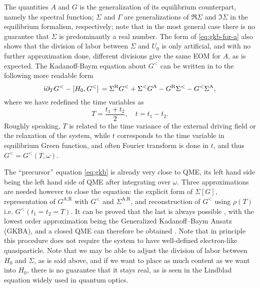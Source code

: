 \documentclass[hyperref, a4paper]{article}
\newcommand*{\ii}{\mathrm{i}}
\begin{document}
The quantities $A$ and $G$  
is the generalization of its equilibrium counterpart, 
namely the spectral function;
$\Sigma$ and $\Gamma$ are generalizations of 
$\Re \Sigma$ and $\Im \Sigma$ in the equilibrium formalism, respectively;
note that in the most general case 
there is no guarantee that $\Sigma$ is predominantly a real number.
The form of \eqref{eq:gkb-for-a} also shows 
that the division of labor between $\Sigma$ and $U_0$
is only artificial, 
and with no further approximation done, 
different divisions give the same EOM for $A$,
as is expected.
The Kadanoff-Baym equation about $G^<$ can be written in to the following more readable form
\begin{equation}
    \ii \partial_T G^< - \comm*{H_0}{G^<} = 
    \Sigma^{\text{R}} G^< + \Sigma^< G^{\text{A}} - G^{\text{R}} \Sigma^< - G^< \Sigma^{\text{A}},
    \label{eq:gkb}
\end{equation}
where we have redefined the time variables as 
\begin{equation}
    T = \frac{t_1 + t_2}{2}, \quad t = t_1 - t_2.
\end{equation}
Roughly speaking, $T$ is related to the time variance 
of the external driving field or the relaxation of the system,
while $t$ corresponds to the time variable 
in equilibrium Green function,
and often Fourier transform is done in $t$,
and thus $G^< = G^<(T, \omega)$. 


The ``precursor'' equation \eqref{eq:gkb} is already very close to QME,
its left hand side being the left hand side of QME 
after integrating over $\omega$.
Three approximations are needed however to close the equation:
the explicit form of $\Sigma[G]$,
representation of $G^{\text{A}, \text{R}}$ with $G^<$ and $\Sigma^{\text{A}, \text{R}}$,
and reconstruction of $G^<$ using $\rho(T)$ i.e. $G^<(t_1 = t_2 = T)$.
It can be proved that the last is always possible \cite{vspivcka2005long},
with the lowest order approximation being the 
Generalized Kadanoff–Baym Ansatz (GKBA),
and a closed QME can therefore be obtained \cite{vspivcka2005long2,haug2008quantum}.
Note that in principle this procedure does not require 
the system to have well-defined electron-like quasiparticle.
Note that we may be able to adjust the division of labor between $H_0$ and $\Sigma$,
as is said above, and 
if we want to place as much content as we want into $H_0$,
there is no guarantee that it stays real,
as is seen in the Lindblad equation 
widely used in quantum optics.
\end{document}
